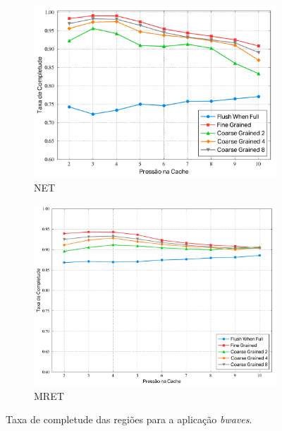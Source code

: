 \documentclass[12pt,twoside]{article}
\begin{document}
\begin{figure}[!ht]
        \centering
        \begin{subfigure}[b]{0.48\textwidth}
                \includegraphics[width=\textwidth]{./figs/net-bwaves-comp-ratio}
                \caption{NET}
                \label{fig-net-bwaves-comp-ratio}
        \end{subfigure}
        \quad
                \begin{subfigure}[b]{0.48\textwidth}
                \includegraphics[width=\textwidth]{./figs/mret-bwaves-comp-ratio}
                \caption{MRET}
                \label{fig-mret-bwaves-comp-ratio}
        \end{subfigure}
\caption{Taxa de completude das regiões para a aplicação \emph{bwaves}.}
\label{fig-completude-bwaves}
\end{figure}
\end{document}
